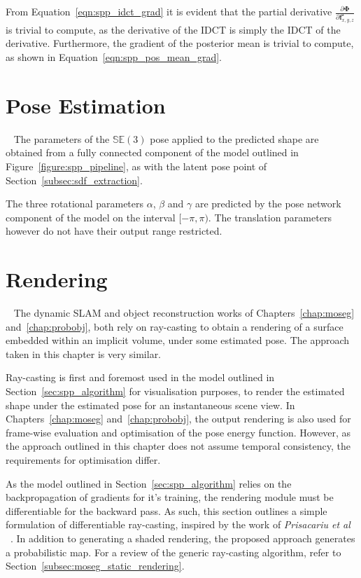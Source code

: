 From Equation~\ref{eqn:spp_idct_grad} it is evident that the partial derivative 
\( \frac{\partial \bm{\Phi}}{\partial \bm{f}_{x, y, z}^{\star}} \) is trivial 
to compute, as the derivative of the IDCT is simply the IDCT of the derivative. 
Furthermore, the gradient of the posterior mean is trivial to compute, as shown 
in Equation~\ref{eqn:spp_pos_mean_grad}.

\section{Pose Estimation}
~\label{sec:spp_pose_estim}
The parameters of the \( \mathbb{SE}(3) \) pose applied to the predicted shape are obtained 
from a fully connected component of the model outlined in Figure~\ref{figure:spp_pipeline}, as with the 
latent pose point of Section~\ref{subsec:sdf_extraction}.

The three rotational parameters \( \alpha \), \( \beta \) and \( \gamma \) are predicted by 
the pose network component of the model on the interval \( [-\pi, \pi) \). The translation parameters 
however do not have their output range restricted.

\section{Rendering}
~\label{sec:spp_rendering}
The dynamic SLAM and object reconstruction works of Chapters~\ref{chap:moseg} and~\ref{chap:probobj}, 
both rely on ray-casting to obtain a rendering of a surface embedded within an implicit volume, under 
some estimated pose. The approach taken in this chapter is very similar. 

Ray-casting is first and foremost used in the model outlined in Section~\ref{sec:spp_algorithm} for 
visualisation purposes, to render the estimated shape under the estimated pose for an instantaneous scene 
view. In Chapters~\ref{chap:moseg} and~\ref{chap:probobj}, the output rendering is also used for frame-wise 
evaluation and optimisation of the pose energy function. However, as the approach outlined in this chapter 
does not assume temporal consistency, the requirements for optimisation differ.

As the model outlined in Section~\ref{sec:spp_algorithm} relies on the backpropagation of gradients for it's 
training, the rendering module must be differentiable for the backward pass. As such, this section outlines a 
simple formulation of differentiable ray-casting, inspired by the work of \textit{Prisacariu et al}
~\cite{Prisacariu2011}. In addition to generating a shaded rendering, the proposed approach generates a 
probabilistic map. For a review of the generic ray-casting algorithm, refer to Section~\ref{subsec:moseg_static_rendering}.

